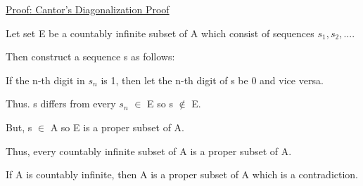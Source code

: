 { \color{magenta} \underline{Proof: Cantor's Diagonalization Proof} } 

	Let set E be a countably infinite subset of A which consist of sequences $s_1,s_2,...$.

	Then construct a sequence s as follows:

	\qquad If the n-th digit in $s_n$ is 1, then let the n-th digit of s be 0
	and vice versa.

	Thus. s differs from every $s_n$ $\in$ E so s $\not \in$ E.

	But, s $\in$ A so E is a proper subset of A.

	Thus, every countably infinite subset of A is a proper subset of A.

	If A is countably infinite, then A is a proper subset of A which
	is a contradiction.



	